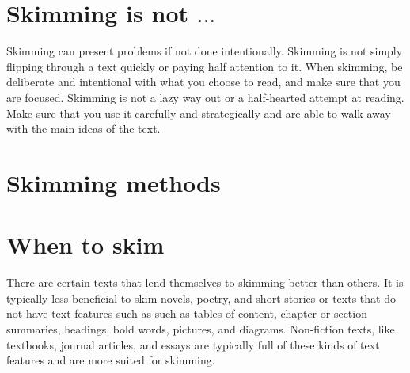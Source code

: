 \documentclass[../main.tex]{subfiles}
\begin{document}
\section{Skimming is not $ \ldots $}
Skimming can present problems if not done intentionally. Skimming is not simply
flipping through a text quickly or paying half attention to it. When skimming,
be deliberate and intentional with what you choose to read, and make sure that
you are focused. Skimming is not a lazy way out or a half-hearted attempt at
reading. Make sure that you use it carefully and strategically and are able to
walk away with the main ideas of the text.
%
\section{Skimming methods}
\begin{cuenotes}
\end{cuenotes}
%
\section{When to skim}
There are certain texts that lend themselves to skimming better than others. It
is typically less beneficial to skim novels, poetry, and short stories or texts
that do not have text features such as such as tables of content, chapter or
section summaries, headings, bold words, pictures, and diagrams. Non-fiction
texts, like textbooks, journal articles, and essays are typically full of these
kinds of text features and are more suited for skimming.
\end{document}
